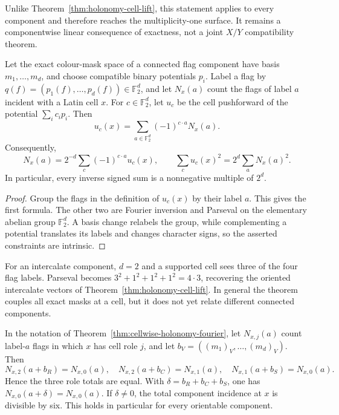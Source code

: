 Unlike Theorem~\ref{thm:holonomy-cell-lift}, this statement applies to every
component and therefore reaches the multiplicity-one surface.  It remains a
componentwise linear consequence of exactness, not a joint $X/Y$
compatibility theorem.

\begin{theorem}
\label{thm:cellwise-holonomy-fourier}
Let the exact colour-mask space of a connected flag component have basis
$m_1,\ldots,m_d$, and choose compatible binary potentials $p_i$.  Label a
flag by $q(f)=(p_1(f),\ldots,p_d(f))\in\mathbb F_2^d$, and let
$N_x(a)$ count the flags of label $a$ incident with a Latin cell $x$.  For
$c\in\mathbb F_2^d$, let $u_c$ be the cell pushforward of the potential
$\sum_i c_i p_i$.  Then
\[
 u_c(x)=\sum_{a\in\mathbb F_2^d}(-1)^{c\cdot a}N_x(a).
\]
Consequently,
\[
 N_x(a)=2^{-d}\sum_c(-1)^{c\cdot a}u_c(x),\qquad
 \sum_c u_c(x)^2=2^d\sum_a N_x(a)^2.
\]
In particular, every inverse signed sum is a nonnegative multiple of $2^d$.
\end{theorem}

\begin{proof}
Group the flags in the definition of $u_c(x)$ by their label $a$.  This gives
the first formula.  The other two are Fourier inversion and Parseval on the
elementary abelian group $\mathbb F_2^d$.  A basis change relabels the group,
while complementing a potential translates its labels and changes character
signs, so the asserted constraints are intrinsic.
\end{proof}

For an intercalate component, $d=2$ and a supported cell sees three of the
four flag labels.  Parseval becomes $3^2+1^2+1^2+1^2=4\cdot3$, recovering
the oriented intercalate vectors of
Theorem~\ref{thm:holonomy-cell-lift}.  In general the theorem couples all exact masks at a cell,
but it does not yet relate different connected components.

\begin{theorem}
\label{thm:cell-role-affine-transport}
In the notation of Theorem~\ref{thm:cellwise-holonomy-fourier}, let
$N_{x,j}(a)$ count label-$a$ flags in which $x$ has cell role $j$, and let
$b_V=((m_1)_V,\ldots,(m_d)_V)$.  Then
\[
 N_{x,2}(a+b_R)=N_{x,0}(a),\quad
 N_{x,2}(a+b_C)=N_{x,1}(a),\quad
 N_{x,1}(a+b_S)=N_{x,0}(a).
\]
Hence the three role totals are equal.  With
$\delta=b_R+b_C+b_S$, one has
$N_{x,0}(a+\delta)=N_{x,0}(a)$.  If $\delta\ne0$, the total component
incidence at $x$ is divisible by six.  This holds in particular for every
orientable component.
\end{theorem}

